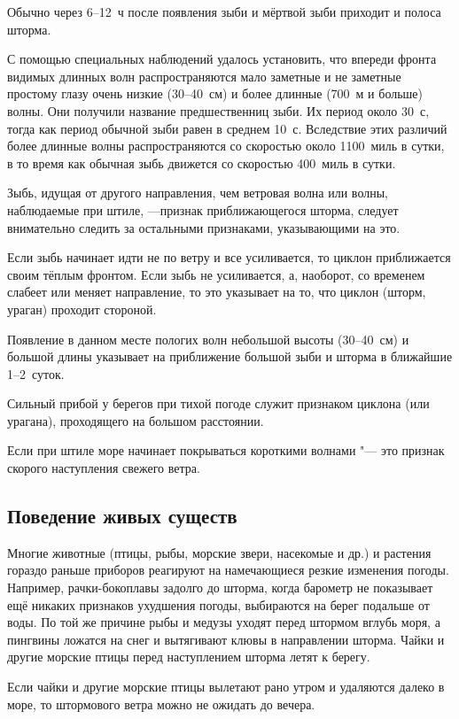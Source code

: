 Обычно через 6--12~ч после появления зыби и мёртвой зыби приходит и
полоса шторма.

С помощью специальных наблюдений удалось установить, что впереди
фронта видимых длинных волн распространяются мало заметные и не
заметные простому глазу очень низкие (30--40~см) и более длинные (700~м
и больше) волны. Они получили название предшественниц зыби. Их период
около 30~с, тогда как период обычной зыби равен в среднем 10~с.
Вследствие этих различий более длинные волны распространяются со
скоростью около 1100~миль в сутки, в то время как обычная зыбь
движется со скоростью 400~миль в сутки.

 Зыбь, идущая от другого направления, чем ветровая волна или
волны, наблюдаемые при штиле, —признак приближающегося шторма, следует
внимательно следить за остальными признаками, указывающими на это.

 Если зыбь начинает идти не по ветру и все усиливается, то
циклон приближается своим тёплым фронтом. Если зыбь не усиливается, а,
наоборот, со временем слабеет или меняет направление, то это указывает
на то, что циклон (шторм, ураган) проходит стороной.

 Появление в данном месте пологих волн небольшой высоты (30--40~см)
и большой длины указывает на приближение большой зыби и шторма в
ближайшие 1--2~суток.

 Сильный прибой у берегов при тихой погоде служит признаком
циклона (или урагана), проходящего на большом расстоянии.

 Если при штиле море начинает покрываться короткими волнами
"--- это признак скорого наступления свежего ветра.

\subsection{Поведение живых существ}

Многие животные (птицы, рыбы, морские звери, насекомые и др.) и
растения гораздо раньше приборов реагируют на намечающиеся резкие
изменения погоды. Например, рачки-бокоплавы задолго до шторма, когда
барометр не показывает ещё никаких признаков ухудшения погоды,
выбираются на берег подальше от воды. По той же причине рыбы и медузы
уходят перед штормом вглубь моря, а пингвины ложатся на снег и
вытягивают клювы в направлении шторма. Чайки и другие морские птицы
перед наступлением шторма летят к берегу.

 Если чайки и другие морские птицы вылетают рано утром и
удаляются далеко в море, то штормового ветра можно не ожидать до
вечера.

